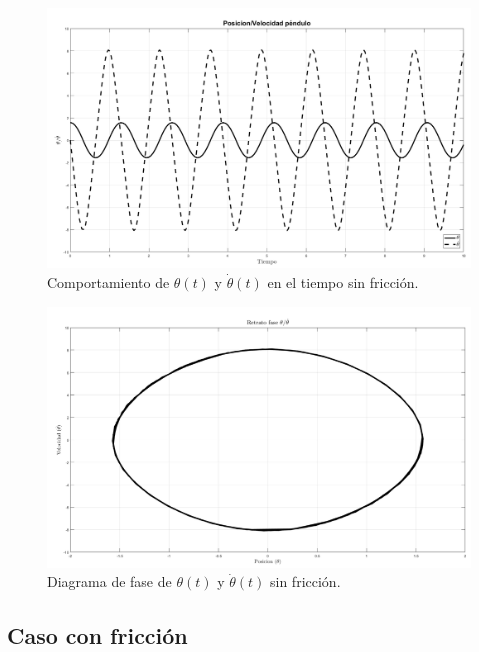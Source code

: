 \begin{figure}[hb!]
 \centering 
 \includegraphics[scale=0.2]{./img/PosVelNF.png}
 \caption{Comportamiento de $\theta(t)$ y $\dot{\theta}(t)$ en el tiempo sin fricción.}
 \label{fig: time plot theta dtheta no friction}
\end{figure}

\begin{figure}[hb!]
 \centering 
 \includegraphics[scale=0.2]{./img/faseNF.png}
\caption{Diagrama de fase de $\theta(t)$ y $\dot{\theta}(t)$ sin fricción.}
 \label{fig: phase plot theta no friction}
\end{figure}

\pagebreak

\subsection{Caso con fricción}

